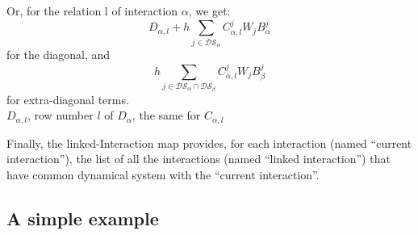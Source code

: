 \documentclass[10pt]{report}
\begin{document}
Or, for the relation l of interaction $\alpha$, we get:
\begin{equation}
D_{\alpha,l}+h\sum_{j\in \mathcal{DS}_{\alpha}}C_{\alpha,l}^jW_jB_{\alpha}^j
\end{equation}
for the diagonal, and
\begin{equation}
h\sum_{j\in \mathcal{DS}_{\alpha}\cap\mathcal{DS}_{\beta}}C_{\alpha,l}^jW_jB_{\beta}^j
\end{equation}
for extra-diagonal terms. \\
$D_{\alpha,l}$, row number $l$ of $D_{\alpha}$, the same for $C_{\alpha,l}$


Finally, the linked-Interaction map provides, for each interaction (named ``current interaction''), the list of all the interactions (named ``linked interaction'') that have common dynamical system with the ``current interaction''.
\subsection{A simple example}

\end{document}
